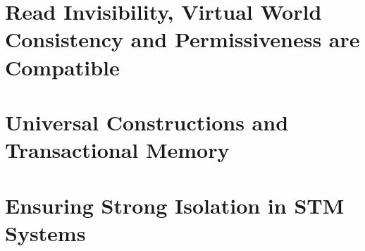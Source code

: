 \documentclass[11pt]{book}
\begin{document}
\chapter{Read Invisibility, Virtual World Consistency and Permissiveness are Compatible}
\label{chap:VWC}



\chapter{Universal Constructions and Transactional Memory}
\label{chap:UC}
%



\chapter{Ensuring Strong Isolation in STM Systems}
\label{chap:SI}
%
\end{document}
